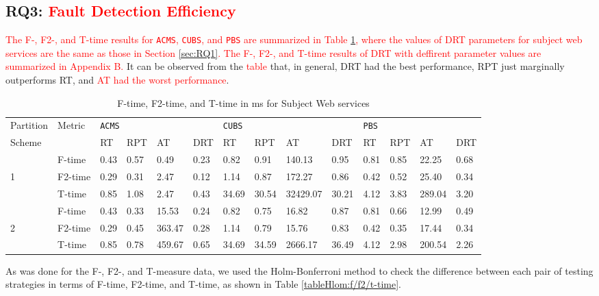 \documentclass[10pt,journal,compsoc]{IEEEtran}
\begin{document}
\subsection{RQ3: \textcolor{red}{Fault Detection Efficiency}}
\label{sec:RQ3}

\textcolor{red}{The F-, F2-, and T-time results for \texttt{ACMS}, \texttt{CUBS}, and \texttt{PBS} are summarized in Table \ref{tab:time}, where the values of DRT parameters for subject web services are the same as those in Section \ref{sec:RQ1}. The F-, F2-, and T-time results of DRT with deffirent parameter values are summarized in Appendix B.} It can be observed from the \textcolor{red}{table} that, in general, DRT had the best performance, RPT just marginally outperforms RT, and \textcolor{red}{AT had the worst performance}.


\begin{table}
	\caption{F-time, F2-time, and T-time in ms for Subject Web services}
	\centering
	\label{tab:time}
	\begin{tabular}{llllllllllllll}
	\toprule
	Partition&\multirow{2}{*}{Metric}&\multicolumn{4}{l}{\texttt{ACMS}}&\multicolumn{4}{l}{\texttt{CUBS}}&\multicolumn{4}{l}{\texttt{PBS}} \\ \cmidrule(lr){3-6} \cmidrule(lr){7-10} \cmidrule(lr){11-14}
	Scheme   &        &RT  &RPT   &AT     &DRT    &RT   &RPT   &AT      &DRT   &RT  &RPT   &AT    &DRT  \\ \midrule
	         &F-time  &0.43&0.57  &0.49   &0.23   &0.82 &0.91  &140.13  &0.95  &0.81&0.85  &22.25 &0.68 \\
	1        &F2-time &0.29&0.31  &2.47   &0.12   &1.14 &0.87  &172.27  &0.86  &0.42&0.52  &25.40 &0.34 \\
	         &T-time  &0.85&1.08  &2.47   &0.43   &34.69&30.54 &32429.07&30.21 &4.12&3.83  &289.04&3.20 \\ \midrule
	         &F-time  &0.43&0.33  &15.53  &0.24   &0.82 &0.75  &16.82   &0.87  &0.81&0.66  &12.99 &0.49 \\
	2        &F2-time &0.29&0.45  &363.47 &0.28   &1.14 &0.79  &15.76   &0.83  &0.42&0.35  &17.44 &0.34 \\
	         &T-time  &0.85&0.78  &459.67 &0.65   &34.69&34.59 &2666.17 &36.49 &4.12&2.98  &200.54&2.26 \\
	\bottomrule 
	\end{tabular}
\end{table}




As was done for the F-, F2-, and T-measure data, we used the Holm-Bonferroni method to check the difference between each pair of testing strategies in terms of F-time, F2-time, and T-time, as shown in Table \ref{tableHlom:f/f2/t-time}.
\end{document}
